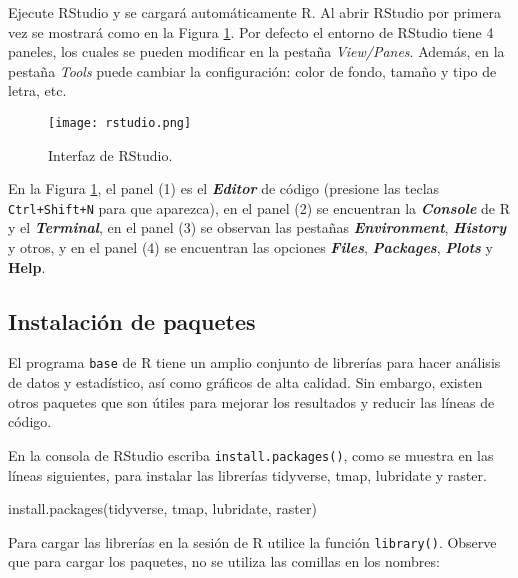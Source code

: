 \documentclass[
]{article}
\newenvironment{Shaded}{\begin{snugshade}}{\end{snugshade}}
\newcommand{\FunctionTok}[1]{\textcolor[rgb]{0.00,0.00,0.00}{#1}}
\newcommand{\NormalTok}[1]{#1}
\newcommand{\StringTok}[1]{\textcolor[rgb]{0.31,0.60,0.02}{#1}}
\begin{document}
Ejecute RStudio y se cargará automáticamente R. Al abrir RStudio por
primera vez se mostrará como en la Figura \ref{fig1}. Por defecto el
entorno de RStudio tiene 4 paneles, los cuales se pueden modificar en la
pestaña \emph{View/Panes}. Además, en la pestaña \emph{Tools} puede
cambiar la configuración: color de fondo, tamaño y tipo de letra, etc.

\begin{figure}
\centering
\texttt{[image: rstudio.png]}
\caption{Interfaz de RStudio.\label{fig1}}
\end{figure}

En la Figura \ref{fig1}, el panel (1) es el \emph{\textbf{Editor}} de
código (presione las teclas \texttt{Ctrl+Shift+N} para que aparezca), en
el panel (2) se encuentran la \textbf{\emph{Console}} de R y el
\emph{\textbf{Terminal}}, en el panel (3) se observan las pestañas
\emph{\textbf{Environment}}, \emph{\textbf{History}} y otros, y en el
panel (4) se encuentran las opciones \textbf{\emph{Files}},
\emph{\textbf{Packages}}, \emph{\textbf{Plots}} y \textbf{Help}.

\hypertarget{instalaciuxf3n-de-paquetes}{%
\subsection{Instalación de paquetes}\label{instalaciuxf3n-de-paquetes}}

El programa \texttt{base} de R tiene un amplio conjunto de librerías
para hacer análisis de datos y estadístico, así como gráficos de alta
calidad. Sin embargo, existen otros paquetes que son útiles para mejorar
los resultados y reducir las líneas de código.

En la consola de RStudio escriba \texttt{install.packages()}, como se
muestra en las líneas siguientes, para instalar las librerías tidyverse,
tmap, lubridate y raster.

\begin{Shaded}
\begin{Highlighting}[]
\FunctionTok{install.packages}\NormalTok{(}\StringTok{\textquotesingle{}tidyverse\textquotesingle{}}\NormalTok{, }\StringTok{\textquotesingle{}tmap\textquotesingle{}}\NormalTok{, }\StringTok{\textquotesingle{}lubridate\textquotesingle{}}\NormalTok{, }\StringTok{\textquotesingle{}raster\textquotesingle{}}\NormalTok{)}
\end{Highlighting}
\end{Shaded}

Para cargar las librerías en la sesión de R utilice la función
\texttt{library()}. Observe que para cargar los paquetes, no se utiliza
las comillas en los nombres:
\end{document}
